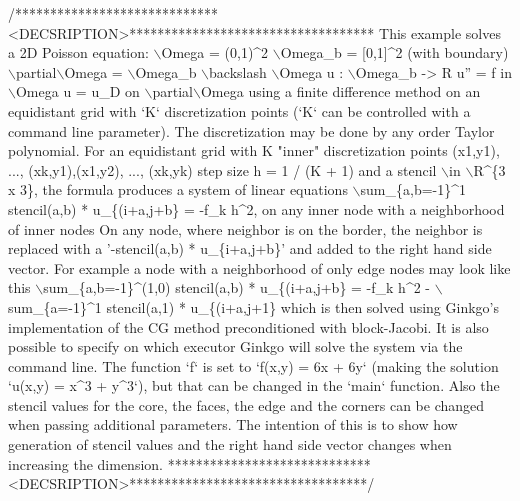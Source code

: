 \begin{DoxyCodeInclude}
\textcolor{comment}{/*****************************<DECSRIPTION>***********************************}
\textcolor{comment}{This example solves a 2D Poisson equation:}
\textcolor{comment}{}
\textcolor{comment}{    \(\backslash\)Omega = (0,1)^2}
\textcolor{comment}{    \(\backslash\)Omega\_b = [0,1]^2   (with boundary)}
\textcolor{comment}{    \(\backslash\)partial\(\backslash\)Omega = \(\backslash\)Omega\_b \(\backslash\)backslash \(\backslash\)Omega}
\textcolor{comment}{    u : \(\backslash\)Omega\_b -> R}
\textcolor{comment}{    u'' = f in \(\backslash\)Omega}
\textcolor{comment}{    u = u\_D on \(\backslash\)partial\(\backslash\)Omega}
\textcolor{comment}{}
\textcolor{comment}{using a finite difference method on an equidistant grid with `K` discretization}
\textcolor{comment}{points (`K` can be controlled with a command line parameter). The discretization}
\textcolor{comment}{may be done by any order Taylor polynomial.}
\textcolor{comment}{For an equidistant grid with K "inner" discretization points (x1,y1), ...,}
\textcolor{comment}{(xk,y1),(x1,y2), ..., (xk,yk) step size h = 1 / (K + 1) and a stencil \(\backslash\)in}
\textcolor{comment}{\(\backslash\)R^\{3 x 3\}, the formula produces a system of linear equations}
\textcolor{comment}{}
\textcolor{comment}{\(\backslash\)sum\_\{a,b=-1\}^1 stencil(a,b) * u\_\{(i+a,j+b\} = -f\_k h^2,  on any inner node with}
\textcolor{comment}{a neighborhood of inner nodes}
\textcolor{comment}{}
\textcolor{comment}{On any node, where neighbor is on the border, the neighbor is replaced with a}
\textcolor{comment}{'-stencil(a,b) * u\_\{i+a,j+b\}' and added to the right hand side vector. For}
\textcolor{comment}{example a node with a neighborhood of only edge nodes may look like this}
\textcolor{comment}{}
\textcolor{comment}{\(\backslash\)sum\_\{a,b=-1\}^(1,0) stencil(a,b) * u\_\{(i+a,j+b\} = -f\_k h^2 - \(\backslash\)sum\_\{a=-1\}^1}
\textcolor{comment}{stencil(a,1) * u\_\{(i+a,j+1\}}
\textcolor{comment}{}
\textcolor{comment}{which is then solved using Ginkgo's implementation of the CG method}
\textcolor{comment}{preconditioned with block-Jacobi. It is also possible to specify on which}
\textcolor{comment}{executor Ginkgo will solve the system via the command line.}
\textcolor{comment}{The function `f` is set to `f(x,y) = 6x + 6y` (making the solution `u(x,y) = x^3}
\textcolor{comment}{+ y^3`), but that can be changed in the `main` function. Also the stencil values}
\textcolor{comment}{for the core, the faces, the edge and the corners can be changed when passing}
\textcolor{comment}{additional parameters.}
\textcolor{comment}{}
\textcolor{comment}{The intention of this is to show how generation of stencil values and the right}
\textcolor{comment}{hand side vector changes when increasing the dimension.}
\textcolor{comment}{*****************************<DECSRIPTION>**********************************/}


\end{DoxyCodeInclude}
